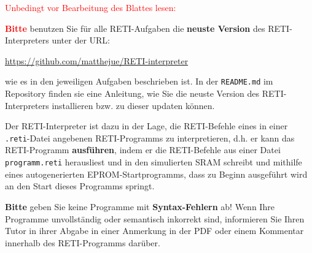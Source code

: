 \documentclass{article}
\newenvironment{adjustedminipage}[1]
{\vspace{0.1cm}\begin{minipage}[t]{#1}}
  {\end{minipage}\vspace{0.1cm}}
\begin{document}
\textcolor{red}{Unbedingt vor Bearbeitung des Blattes lesen:}

{\LARGE\bfseries\textcolor{red}{Bitte}} benutzen Sie für alle RETI-Aufgaben die \textbf{neuste Version} des RETI-Interpreters unter der URL:

\begin{center}
	\begin{adjustedminipage}{0.9\textwidth}
    \url{https://github.com/matthejue/RETI-interpreter}
	\end{adjustedminipage}
\end{center}

\sloppy

wie es in den jeweiligen Aufgaben beschrieben ist. In der \verb|README.md| im Repository finden sie eine Anleitung, wie Sie die neuste Version des RETI-Interpreters installieren bzw. zu dieser updaten können.

Der RETI-Interpreter ist dazu in der Lage, die RETI-Befehle eines in einer \verb|.reti|-Datei angebenen RETI-Programms zu interpretieren, d.h. er kann das RETI-Programm \textbf{ausführen}, indem er die RETI-Befehle aus einer Datei \texttt{programm.reti} herausliest und in den simulierten SRAM schreibt und mithilfe eines autogenerierten EPROM-Startprogramms, dass zu Beginn ausgeführt wird an den Start dieses Programms springt.


{\LARGE\bfseries\color{red}Bitte} geben Sie keine Programme mit \textbf{Syntax-Fehlern} ab! Wenn Ihre Programme unvollständig oder semantisch inkorrekt sind, informieren Sie Ihren Tutor in ihrer Abgabe in einer Anmerkung in der PDF oder einem Kommentar innerhalb des RETI-Programms darüber.
\end{document}
